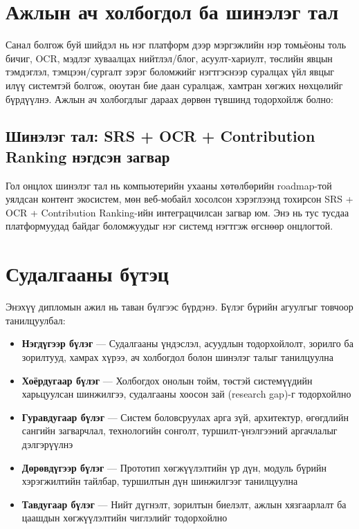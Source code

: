 \section{Ажлын ач холбогдол ба шинэлэг тал}

Санал болгож буй шийдэл нь нэг платформ дээр мэргэжлийн нэр томьёоны толь бичиг, OCR, мэдлэг хуваалцах нийтлэл/блог, асуулт-хариулт, төслийн явцын тэмдэглэл, тэмцээн/сургалт зэрэг боломжийг нэгтгэснээр суралцах үйл явцыг илүү системтэй болгож, оюутан бие даан суралцаж, хамтран хөгжих нөхцөлийг бүрдүүлнэ. Ажлын ач холбогдлыг дараах дөрвөн түвшинд тодорхойлж болно:

\subsection{Шинэлэг тал: SRS + OCR + Contribution Ranking нэгдсэн загвар}

Гол онцлох шинэлэг тал нь компьютерийн ухааны хөтөлбөрийн roadmap-той уялдсан контент экосистем, мөн веб-мобайл хосолсон хэрэглээнд тохирсон SRS + OCR + Contribution Ranking-ийн интеграцчилсан загвар юм. Энэ нь тус тусдаа платформуудад байдаг боломжуудыг нэг системд нэгтгэж өгснөөр онцлогтой.


\section{Судалгааны бүтэц}

Энэхүү дипломын ажил нь таван бүлгээс бүрдэнэ. Бүлэг бүрийн агуулгыг товчоор танилцуулбал:

\begin{itemize}[leftmargin=2em, itemsep=0.3em]
    \item \textbf{Нэгдүгээр бүлэг} — Судалгааны үндэслэл, асуудлын тодорхойлолт, зорилго ба зорилтууд, хамрах хүрээ, ач холбогдол болон шинэлэг талыг танилцуулна

    \item \textbf{Хоёрдугаар бүлэг} — Холбогдох онолын тойм, төстэй системүүдийн харьцуулсан шинжилгээ, судалгааны хоосон зай (research gap)-г тодорхойлно

    \item \textbf{Гуравдугаар бүлэг} — Систем боловсруулах арга зүй, архитектур, өгөгдлийн сангийн загварчлал, технологийн сонголт, туршилт-үнэлгээний аргачлалыг дэлгэрүүлнэ

    \item \textbf{Дөрөвдүгээр бүлэг} — Прототип хөгжүүлэлтийн үр дүн, модуль бүрийн хэрэгжилтийн тайлбар, туршилтын дүн шинжилгээг танилцуулна

    \item \textbf{Тавдугаар бүлэг} — Нийт дүгнэлт, зорилтын биелэлт, ажлын хязгаарлалт ба цаашдын хөгжүүлэлтийн чиглэлийг тодорхойлно
\end{itemize}
